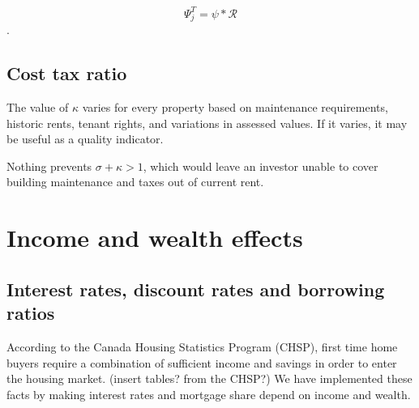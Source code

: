 \[\Psi_j^T = \psi * \mathcal{R}\].  


\subsection{Cost tax ratio}\label{SS:CostRatio} 
The value of $\kappa$  varies for every property based on maintenance requirements, historic rents, tenant rights, and variations in assessed values. If it varies, it may be useful as a quality indicator.


Nothing prevents $\sigma+\kappa >1$, which would leave an investor unable to cover building maintenance and taxes out of current rent. 


\section{Income and wealth effects}
\subsection{Interest rates, discount rates and borrowing ratios} \label{SS:RatesAndRatios}

According to the Canada Housing Statistics Program (CHSP), first time home buyers require a combination of sufficient income and savings in order to enter the housing market. (insert tables? from the CHSP?) We have implemented these facts by making interest rates and mortgage share depend on income and wealth.




 

